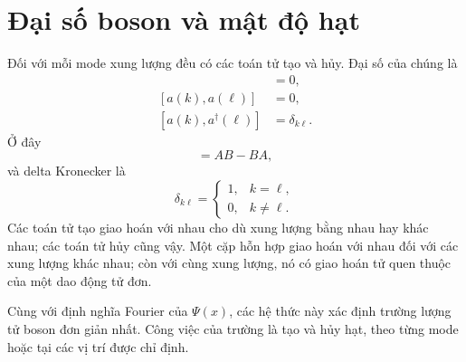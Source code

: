 \section{Đại số boson và mật độ hạt}

Đối với mỗi mode xung lượng đều có các toán tử tạo và hủy. Đại số của chúng là
\begin{align}
[a^\dagger(k),a^\dagger(\ell)]&=0,\\
[a(k),a(\ell)]&=0,\\
[a(k),a^\dagger(\ell)]&=\delta_{k\ell}.
\end{align}
Ở đây
\begin{equation}
[A,B]=AB-BA,
\end{equation}
và delta Kronecker là
\begin{equation}
\delta_{k\ell}=
\begin{cases}
1,&k=\ell,\\
0,&k\ne\ell.
\end{cases}
\end{equation}
Các toán tử tạo giao hoán với nhau cho dù xung lượng bằng nhau hay khác nhau; các toán tử hủy cũng vậy. Một cặp hỗn hợp giao hoán với nhau đối với các xung lượng khác nhau; còn với cùng xung lượng, nó có giao hoán tử quen thuộc của một dao động tử đơn.

Cùng với định nghĩa Fourier của \(\Psi(x)\), các hệ thức này xác định trường lượng tử boson đơn giản nhất. Công việc của trường là tạo và hủy hạt, theo từng mode hoặc tại các vị trí được chỉ định.

